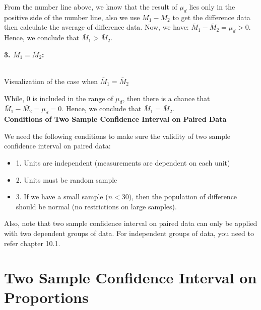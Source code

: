 From the number line above, we know that the result of $\mu_d$ lies only in the positive side of the number line, also we use $M_1 - M_2$ to get the difference data then calculate the average of difference data. Now, we have: $\bar{M}_1 - \bar{M}_2 = \mu_d > 0$. Hence, we conclude that $\bar{M}_1 > \bar{M}_2.$

\textbf{3. $\bar{M}_1 = \bar{M}_2$:}

\begin{center}
\vspace{0.5em}
\small\textbf{}\\Visualization of the case when $\bar{M}_1 = \bar{M}_2$
\end{center}

While, 0 is included in the range of $\mu_d$, then there is a chance that $\bar{M}_1 - \bar{M_2} = \mu_d = 0.$ Hence, we conclude that $\bar{M}_1 = \bar{M}_2$.\\

\textbf{Conditions of Two Sample Confidence Interval on Paired Data}

We need the following conditions to make sure the validity of two sample confidence interval on paired data:

\begin{itemize}
	\item 1. Units are independent (measurements are dependent on each unit)
	\item 2. Units must be random sample
	\item 3. If we have a small sample ($n < 30$), then the population of difference should be normal (no restrictions on large samples).
\end{itemize}

Also, note that two sample confidence interval on paired data can only be applied with two dependent groups of data. For independent groups of data, you need to refer chapter 10.1.

\section{Two Sample Confidence Interval on Proportions}

